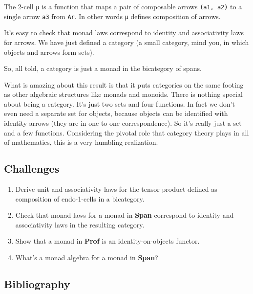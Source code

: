 The 2-cell \texttt{μ} is a function that maps a pair of composable
arrows \texttt{(a1,\ a2)} to a single arrow \texttt{a3} from
\texttt{Ar}. In other words \texttt{μ} defines composition of arrows.

It's easy to check that monad laws correspond to identity and
associativity laws for arrows. We have just defined a category (a small
category, mind you, in which objects and arrows form sets).

So, all told, a category is just a monad in the bicategory of spans.

What is amazing about this result is that it puts categories on the same
footing as other algebraic structures like monads and monoids. There is
nothing special about being a category. It's just two sets and four
functions. In fact we don't even need a separate set for objects,
because objects can be identified with identity arrows (they are in
one-to-one correspondence). So it's really just a set and a few
functions. Considering the pivotal role that category theory plays in
all of mathematics, this is a very humbling realization.

\subsection{Challenges}\label{challenges}

\begin{enumerate}
\tightlist
\item
  Derive unit and associativity laws for the tensor product defined as
  composition of endo-1-cells in a bicategory.
\item
  Check that monad laws for a monad in \textbf{Span} correspond to
  identity and associativity laws in the resulting category.
\item
  Show that a monad in \textbf{Prof} is an identity-on-objects functor.
\item
  What's a monad algebra for a monad in \textbf{Span}?
\end{enumerate}

\subsection{Bibliography}\label{bibliography}
